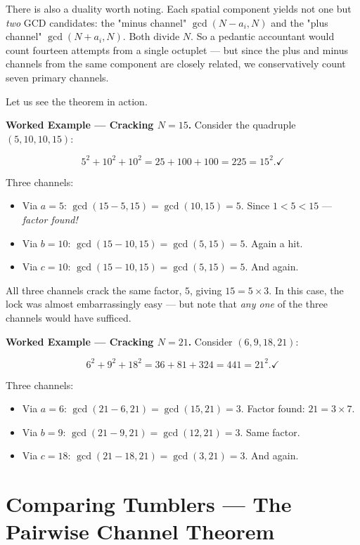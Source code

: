 \documentclass[11pt,twoside,openright]{book}
\theoremstyle{definition}
\theoremstyle{remark}
\begin{document}
There is also a duality worth noting. Each spatial component yields not one but \textit{two} GCD candidates: the "minus channel" $\gcd(N - a_i, N)$ and the "plus channel" $\gcd(N + a_i, N)$. Both divide $N$. So a pedantic accountant would count fourteen attempts from a single octuplet --- but since the plus and minus channels from the same component are closely related, we conservatively count seven primary channels.

Let us see the theorem in action.

\textbf{Worked Example --- Cracking $N = 15$.} Consider the quadruple $(5, 10, 10, 15)$:

\[5^2 + 10^2 + 10^2 = 25 + 100 + 100 = 225 = 15^2. \checkmark\]

Three channels:

\begin{itemize}
  \item Via $a = 5$: $\gcd(15 - 5, 15) = \gcd(10, 15) = 5$. Since $1 < 5 < 15$ --- \textit{factor found!}
  \item Via $b = 10$: $\gcd(15 - 10, 15) = \gcd(5, 15) = 5$. Again a hit.
  \item Via $c = 10$: $\gcd(15 - 10, 15) = \gcd(5, 15) = 5$. And again.
\end{itemize}

All three channels crack the same factor, $5$, giving $15 = 5 \times 3$. In this case, the lock was almost embarrassingly easy --- but note that \textit{any one} of the three channels would have sufficed.

\textbf{Worked Example --- Cracking $N = 21$.} Consider $(6, 9, 18, 21)$:

\[6^2 + 9^2 + 18^2 = 36 + 81 + 324 = 441 = 21^2. \checkmark\]

Three channels:

\begin{itemize}
  \item Via $a = 6$: $\gcd(21 - 6, 21) = \gcd(15, 21) = 3$. Factor found: $21 = 3 \times 7$.
  \item Via $b = 9$: $\gcd(21 - 9, 21) = \gcd(12, 21) = 3$. Same factor.
  \item Via $c = 18$: $\gcd(21 - 18, 21) = \gcd(3, 21) = 3$. And again.
\end{itemize}




\section{Comparing Tumblers --- The Pairwise Channel Theorem}
\end{document}
